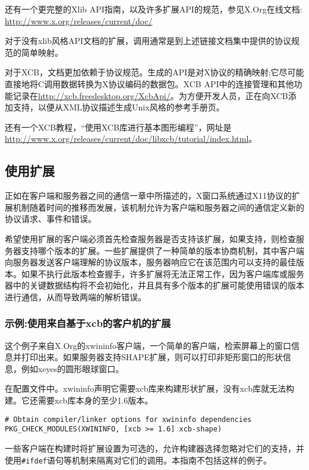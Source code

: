 还有一个更完整的Xlib API指南，以及许多扩展API的规范，参见X.Org在线文档: \url{http://www.x.org/releases/current/doc/}

对于没有xlib风格API文档的扩展，调用通常是到上述链接文档集中提供的协议规范的简单映射。

对于XCB，文档更加依赖于协议规范。生成的API是对X协议的精确映射;它尽可能直接地将C调用数据转换为X协议编码的数据包。XCB API中的连接管理和其他功能记录在\url{http://xcb.freedesktop.org/XcbApi/}。为方便开发人员，正在向XCB添加支持，以便从XML协议描述生成Unix风格的参考手册页。

还有一个XCB教程，“使用XCB库进行基本图形编程”，网址是\url{http://www.x.org/releases/current/doc/libxcb/tutorial/index.html}。

\subsection{使用扩展}

正如在客户端和服务器之间的通信一章中所描述的，X窗口系统通过X11协议的扩展机制随着时间的推移而发展，该机制允许为客户端和服务器之间的通信定义新的协议请求、事件和错误。

希望使用扩展的客户端必须首先检查服务器是否支持该扩展，如果支持，则检查服务器支持哪个版本的扩展。一些扩展提供了一种简单的版本协商机制，其中客户端向服务器发送客户端理解的协议版本，服务器响应它在该范围内可以支持的最佳版本。如果不执行此版本检查握手，许多扩展将无法正常工作，因为客户端库或服务器中的关键数据结构将不会初始化，并且具有多个版本的扩展可能使用错误的版本进行通信，从而导致两端的解析错误。

\subsubsection{示例:使用来自基于xcb的客户机的扩展}

这个例子来自X.Org的xwininfo客户端，一个简单的客户端，检索屏幕上的窗口信息并打印出来。如果服务器支持SHAPE扩展，则可以打印非矩形窗口的形状信息，例如xeyes的圆形眼球窗口。

\noindent 在配置文件中。xwininfo声明它需要xcb库来构建形状扩展，没有xcb库就无法构建。它还需要xcb库本身的至少1.6版本。

\begin{lstlisting}
# Obtain compiler/linker options for xwininfo dependencies
PKG_CHECK_MODULES(XWININFO, [xcb >= 1.6] xcb-shape)
\end{lstlisting}

\noindent 一些客户端在构建时将扩展设置为可选的，允许构建器选择忽略对它们的支持，并使用\lstinline|#ifdef|语句等机制来隔离对它们的调用。本指南不包括这样的例子。

